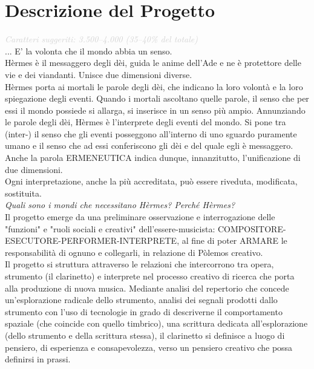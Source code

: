 \documentclass[a4paper,12pt]{article}
\begin{document}
\section{Descrizione del Progetto}
{\small\textcolor{lightgray}{\textit{Caratteri suggeriti: 3.500--4.000 (35--40\% del totale)}}}\\

... E' la volonta che il mondo abbia un senso.\\
Hèrmes è il messaggero degli dèi, guida le anime dell'Ade e ne è protettore delle vie e dei viandanti. Unisce due dimensioni diverse.\\
Hèrmes porta ai mortali le parole degli dèi, che indicano la loro volontà e la loro spiegazione degli eventi. Quando i mortali ascoltano quelle parole, il senso che per essi il mondo possiede si allarga, si inserisce in un senso più ampio. Annunziando le parole degli dèi, Hèrmes è l'interprete degli eventi del mondo. Si pone tra (inter-) il senso che gli eventi posseggono all'interno di uno sguardo puramente umano e il senso che ad essi conferiscono gli dèi e del quale egli è messaggero.\\
Anche la parola ERMENEUTICA indica dunque, innanzitutto, l'unificazione di due dimensioni.\\ %
Ogni interpretazione, anche la più accreditata, può essere riveduta, modificata, sostituita.\\

\emph{Quali sono i mondi che necessitano Hèrmes? Perché Hèrmes?}\\


Il progetto emerge da una preliminare osservazione e interrogazione delle "funzioni" e "ruoli sociali e creativi" dell'essere-musicista: COMPOSITORE-ESECUTORE-PERFORMER-INTERPRETE,  al fine di poter ARMARE le responsabilità di ognuno e collegarli, in relazione di Pòlemos creativo.\\
Il progetto si struttura attraverso le relazioni che intercorrono tra opera,
strumento (il clarinetto) e interprete nel processo creativo di ricerca che
porta alla produzione di nuova musica. Mediante analisi del repertorio che
concede un'esplorazione radicale dello strumento, analisi dei segnali prodotti
dallo strumento con l'uso di tecnologie in grado di descriverne il
comportamento spaziale (che coincide con quello timbrico), una scrittura
dedicata all'esplorazione (dello strumento e della scrittura stessa), il
clarinetto si definisce a luogo di pensiero, di esperienza e consapevolezza,
verso un pensiero creativo che possa definirsi in prassi.
\end{document}
